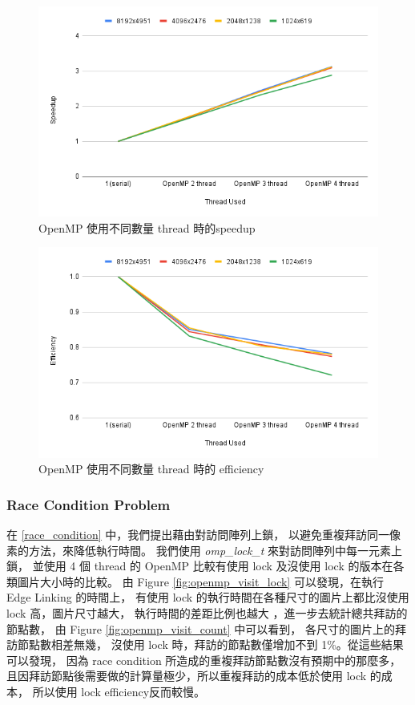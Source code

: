\documentclass[sigconf,nonacm]{acmart}
\begin{document}
\begin{figure}[htbp]
  \centering
  \includegraphics[width=\linewidth]{"./image/openmp_speedup.png"}
  \caption{OpenMP 使用不同數量 thread 時的speedup}
  \label{fig:openmp_speedup}
\end{figure}

\begin{figure}[htbp]
  \centering
  \includegraphics[width=\linewidth]{"./image/openmp_efficiency.png"}
  \caption{OpenMP 使用不同數量 thread 時的 efficiency}
  \label{fig:openmp_efficiency}
\end{figure}

\subsubsection{Race Condition Problem}

在 \ref{race_condition} 中，我們提出藉由對訪問陣列上鎖，
以避免重複拜訪同一像素的方法，來降低執行時間。
我們使用 \emph{omp\_lock\_t} 來對訪問陣列中每一元素上鎖，
並使用 4 個 thread 的 OpenMP 比較有使用 lock 及沒使用 lock 的版本在各類圖片大小時的比較。
由 Figure \ref{fig:openmp_visit_lock} 可以發現，在執行 Edge Linking 的時間上，
有使用 lock 的執行時間在各種尺寸的圖片上都比沒使用 lock 高，圖片尺寸越大，
執行時間的差距比例也越大 ，進一步去統計總共拜訪的節點數，
由 Figure \ref{fig:openmp_visit_count} 中可以看到，
各尺寸的圖片上的拜訪節點數相差無幾，
沒使用 lock 時，拜訪的節點數僅增加不到 1\%。從這些結果可以發現，
因為 race condition 所造成的重複拜訪節點數沒有預期中的那麼多，
且因拜訪節點後需要做的計算量極少，所以重複拜訪的成本低於使用 lock 的成本，
所以使用 lock  efficiency反而較慢。
\end{document}
